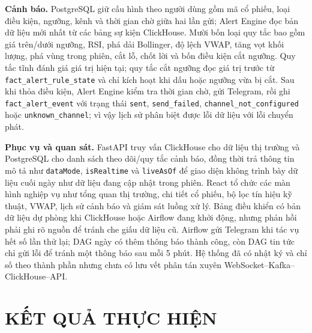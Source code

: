 \documentclass[conference,a4paper]{IEEEtran}
\newcommand{\code}[1]{\texttt{#1}}
\begin{document}
\textbf{Cảnh báo.} PostgreSQL giữ cấu hình theo người dùng gồm mã cổ phiếu, loại điều kiện, ngưỡng, kênh và thời gian chờ giữa hai lần gửi; Alert Engine đọc bản dữ liệu mới nhất từ các bảng sự kiện ClickHouse. Mười bốn loại quy tắc bao gồm giá trên/dưới ngưỡng, RSI, phá dải Bollinger, độ lệch VWAP, tăng vọt khối lượng, phá vùng trong phiên, cắt lỗ, chốt lời và bốn điều kiện cắt ngưỡng. Quy tắc tĩnh đánh giá giá trị hiện tại; quy tắc cắt ngưỡng đọc giá trị trước từ \code{fact\_alert\_rule\_state} và chỉ kích hoạt khi dấu hoặc ngưỡng vừa bị cắt. Sau khi thỏa điều kiện, Alert Engine kiểm tra thời gian chờ, gửi Telegram, rồi ghi \code{fact\_alert\_event} với trạng thái \code{sent}, \code{send\_failed}, \code{channel\_not\_configured} hoặc \code{unknown\_channel}; vì vậy lịch sử phân biệt được lỗi dữ liệu với lỗi chuyển phát.

\textbf{Phục vụ và quan sát.} FastAPI truy vấn ClickHouse cho dữ liệu thị trường và PostgreSQL cho danh sách theo dõi/quy tắc cảnh báo, đồng thời trả thông tin mô tả như \code{dataMode}, \code{isRealtime} và \code{liveAsOf} để giao diện không trình bày dữ liệu cuối ngày như dữ liệu đang cập nhật trong phiên. React tổ chức các màn hình nghiệp vụ như tổng quan thị trường, chi tiết cổ phiếu, bộ lọc tín hiệu kỹ thuật, VWAP, lịch sử cảnh báo và giám sát luồng xử lý. Bảng điều khiển có bản dữ liệu dự phòng khi ClickHouse hoặc Airflow đang khởi động, nhưng phản hồi phải ghi rõ nguồn để tránh che giấu dữ liệu cũ. Airflow gửi Telegram khi tác vụ hết số lần thử lại; DAG ngày có thêm thông báo thành công, còn DAG tin tức chỉ gửi lỗi để tránh một thông báo sau mỗi 5 phút. Hệ thống đã có nhật ký và chỉ số theo thành phần nhưng chưa có lưu vết phân tán xuyên WebSocket--Kafka--ClickHouse--API.

\section{KẾT QUẢ THỰC HIỆN}
\end{document}
